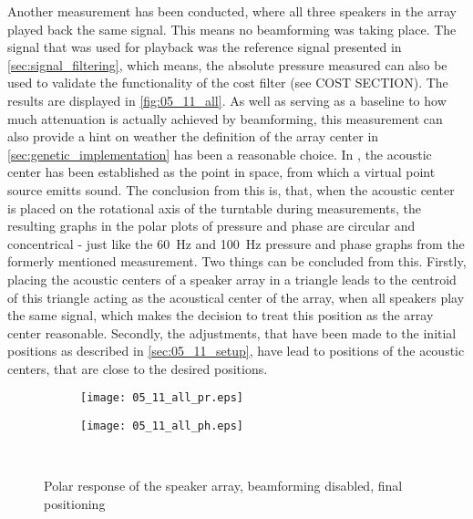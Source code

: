 Another measurement has been conducted, where all three speakers in the array played back the same signal. This means no beamforming was taking place. The signal that was used for playback was the reference signal presented in \autoref{sec:signal_filtering}, which means, the absolute pressure measured can also be used to validate the functionality of the cost filter (see COST SECTION). The results are displayed in \autoref{fig:05_11_all}. As well as serving as a baseline to how much attenuation is actually achieved by beamforming, this measurement can also provide a hint on weather the definition of the array center in \autoref{sec:genetic_implementation} has been a reasonable choice.
In \label{sec:ac_center}, the acoustic center has been established as the point in space, from which a virtual point source emitts sound. The conclusion from this is, that, when the acoustic center is placed on the rotational axis of the turntable during measurements, the resulting graphs in the polar plots of pressure and phase are circular and concentrical - just like the \SI{60}{\hertz} and \SI{100}{\hertz} pressure and phase graphs from the formerly mentioned measurement. 
Two things can be concluded from this. Firstly, placing the acoustic centers of a speaker array in a triangle leads to the centroid of this triangle acting as the acoustical center of the array, when all speakers play the same signal, which makes the decision to treat this position as the array center reasonable. Secondly, the adjustments, that have been made to the initial positions as described in \autoref{sec:05_11_setup}, have lead to positions of the acoustic centers, that are close to the desired positions.

\begin{figure}[h]
\begin{subfigure}[c]{0.5\textwidth}
\texttt{[image: 05\_11\_all\_pr.eps]}
\label{fig:05_11_all_pr}
\end{subfigure}
\begin{subfigure}[c]{0.5\textwidth}
\texttt{[image: 05\_11\_all\_ph.eps]}
\label{fig:05_11_all_ph}
\end{subfigure}\\
\caption{Polar response of the speaker array, beamforming disabled, final positioning}  
\label{fig:05_11_all}
\end{figure}

